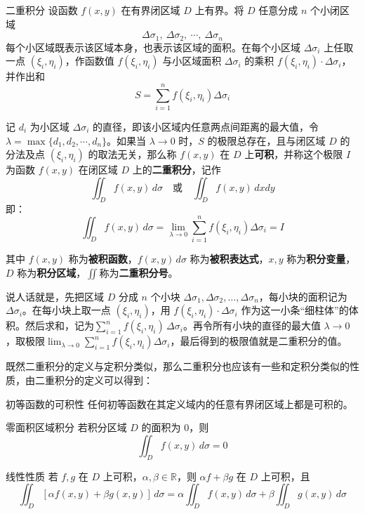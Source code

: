 \begin{definition}{二重积分}{}
设函数 \(f(x,y)\) 在有界闭区域 \(D\) 上有界。将 \(D\) 任意分成 \(n\) 个小闭区域
\[
\Delta\sigma_1,\ \Delta\sigma_2,\ \cdots,\ \Delta\sigma_n
\]
每个小区域既表示该区域本身，也表示该区域的面积。在每个小区域 \(\Delta\sigma_i\) 上任取一点 \((\xi_i,\eta_i)\)，作函数值 \(f(\xi_i,\eta_i)\) 与小区域面积 \(\Delta\sigma_i\) 的乘积 \(f(\xi_i,\eta_i) \cdot \Delta\sigma_i\)，并作出和
\[
S = \sum_{i=1}^{n} f(\xi_i,\eta_i) \Delta\sigma_i
\]

记 \(d_i\) 为小区域 \(\Delta\sigma_i\) 的直径，即该小区域内任意两点间距离的最大值，令 \(\lambda = \max\{d_1,d_2,\cdots,d_n\}\)。如果当 \(\lambda \to 0\) 时，\(S\) 的极限总存在，且与闭区域 \(D\) 的分法及点 \((\xi_i,\eta_i)\) 的取法无关，那么称 \(f(x,y)\) 在 \(D\) 上\textbf{可积}，并称这个极限 \(I\) 为函数 \(f(x,y)\) 在闭区域 \(D\) 上的\textbf{二重积分}，记作
\[
\iint_{D} f(x,y)\,d\sigma
\quad\text{或}\quad
\iint_{D} f(x,y)\,dxdy
\]
即：
\[
\iint_{D} f(x,y)\,d\sigma = \lim_{\lambda \to 0} \sum_{i=1}^{n} f(\xi_i,\eta_i) \Delta\sigma_i = I
\]

其中 \(f(x,y)\) 称为\textbf{被积函数}，\(f(x,y)\,d\sigma\) 称为\textbf{被积表达式}，\(x,y\) 称为\textbf{积分变量}，\(D\) 称为\textbf{积分区域}，$\iint$称为\textbf{二重积分号}。
\end{definition}

说人话就是，先把区域 $D$ 分成 $n$ 个小块 $\Delta\sigma_1, \Delta\sigma_2, \dots, \Delta\sigma_n$，每小块的面积记为 $\Delta\sigma_i$。在每小块上取一点 $(\xi_i, \eta_i)$，用 $f(\xi_i, \eta_i) \cdot \Delta\sigma_i$ 作为这一小条“细柱体”的体积。然后求和，记为$\sum_{i=1}^n f(\xi_i, \eta_i)\, \Delta\sigma_i$。再令所有小块的直径的最大值 $\lambda \to 0$，取极限$\lim_{\lambda \to 0} \sum_{i=1}^{n} f(\xi_i,\eta_i) \Delta\sigma_i$，最后得到的极限值就是二重积分的值。

既然二重积分的定义与定积分类似，那么二重积分也应该有一些和定积分类似的性质，由二重积分的定义可以得到：

\begin{theorem}{初等函数的可积性}{}
任何初等函数在其定义域内的任意有界闭区域上都是可积的。
\end{theorem}

\begin{theorem}{零面积区域积分}{}
若积分区域 \(D\) 的面积为 \(0\)，则
\[\iint_{D} f(x,y)\,d\sigma = 0\]
\end{theorem}

\begin{theorem}{线性性质}{}
若 \(f,g\) 在 \(D\) 上可积，\(\alpha,\beta \in \mathbb{R}\)，则 \(\alpha f+\beta g\) 在 \(D\) 上可积，且
\[\iint_{D} [\alpha f(x,y)+\beta g(x,y)]\,d\sigma = \alpha \iint_{D} f(x,y)\,d\sigma + \beta \iint_{D} g(x,y)\,d\sigma\]
\end{theorem}

